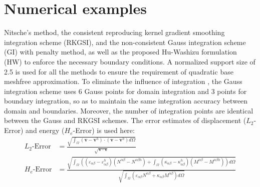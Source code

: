 
\section{Numerical examples}\label{examples}
\DIFdelbegin {}\DIFdelend \DIFaddbegin {}\DIFaddend Nitsche's method, the consistent reproducing kernel gradient smoothing integration scheme (RKGSI), and the non-consistent Gauss integration scheme (GI) with penalty method, as well as the proposed Hu-Washizu formulation (HW) to enforce the necessary boundary conditions\DIFdelbegin {}\DIFdelend . A normalized support size of 2.5 is used for all the \DIFaddbegin {}\DIFaddend methods to ensure the requirement of quadratic base meshfree approximation. To eliminate the influence of integration \DIFaddbegin {}\DIFaddend , the Gauss integration scheme uses 6 Gauss points for domain integration and 3 points for boundary integration, so as to maintain the same integration accuracy between domain and boundaries. Moreover, the number of integration points are identical between the Gauss and RKGSI schemes. The error estimates of displacement ($L_2$-Error) and energy ($H_e$-Error) is used here:
\begin{equation}
\begin{split}
L_2\text{-Error} &= \frac{\sqrt{\int_\Omega(\boldsymbol v - \boldsymbol v^h) \cdot (\boldsymbol v - \boldsymbol v^h)d\Omega}}{\sqrt{\boldsymbol v \cdot \boldsymbol v}} \\
H_e\text{-Error} &= \frac{\sqrt{\int_\Omega \left ((\varepsilon_{\alpha\beta} - \varepsilon_{\alpha\beta}^h)(N^{\alpha\beta} - N^{\alpha\beta h}) + \int_\Omega(\kappa_{\alpha\beta}-\kappa_{\alpha\beta}^h)(M^{\alpha\beta}-M^{\alpha\beta h}) \right )d\Omega}}{\sqrt{\int_\Omega(\varepsilon_{\alpha\beta}N^{\alpha\beta} + \kappa_{\alpha\beta}M^{\alpha\beta})d\Omega}}
\end{split}
\end{equation}


